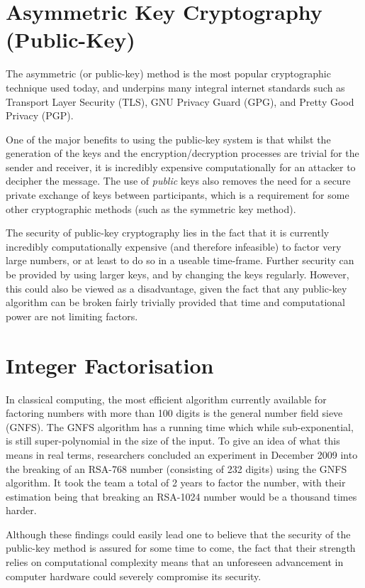 \documentclass[runningheads,a4paper]{llncs}
\begin{document}
\section{Asymmetric Key Cryptography (Public-Key)} 

The asymmetric (or public-key) method is the most popular cryptographic technique used today, and underpins many integral internet standards such as Transport Layer Security (TLS), GNU Privacy Guard (GPG), and Pretty Good Privacy (PGP).

One of the major benefits to using the public-key system is that whilst the generation of the keys and the encryption/decryption processes are trivial for the sender and receiver, it is incredibly expensive computationally for an attacker to decipher the message. The use of \emph{public} keys also removes the need for a secure private exchange of keys between participants, which is a requirement for some other cryptographic methods (such as the symmetric key method).

The security of public-key cryptography lies in the fact that it is currently incredibly computationally expensive (and therefore infeasible) to factor very large numbers, or at least to do so in a useable time-frame. Further security can be provided by using larger keys, and by changing the keys regularly. However, this could also be viewed as a disadvantage, given the fact that any public-key algorithm can be broken fairly trivially provided that time and computational power are not limiting factors.

\section{Integer Factorisation}

In classical computing, the most efficient algorithm currently available for factoring numbers with more than 100 digits is the general number field sieve (GNFS). The GNFS algorithm has a running time which while sub-exponential, is still super-polynomial in the size of the input. To give an idea of what this means in real terms, researchers concluded an experiment in December 2009 into the breaking of an RSA-768 number (consisting of 232 digits) using the GNFS algorithm. It took the team a total of 2 years to factor the number, with their estimation being that breaking an RSA-1024 number would be a thousand times harder\cite{Kleinjung:2010:FRM:1881412.1881436}. 

Although these findings could easily lead one to believe that the security of the public-key method is assured for some time to come, the fact that their strength relies on computational complexity means that an unforeseen advancement in  computer hardware could severely compromise its security. 
\end{document}
